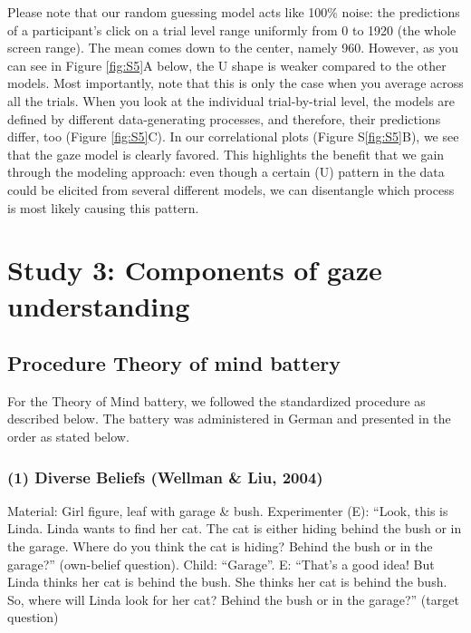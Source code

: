 \documentclass[
  man,mask,floatsintext]{apa7}
\begin{document}
Please note that our random guessing model acts like 100\% noise: the predictions of a participant's click on a trial level range uniformly from 0 to 1920 (the whole screen range). The mean comes down to the center, namely 960. However, as you can see in Figure \ref{fig:S5}A below, the U shape is weaker compared to the other models. Most importantly, note that this is only the case when you average across all the trials. When you look at the individual trial-by-trial level, the models are defined by different data-generating processes, and therefore, their predictions differ, too (Figure \ref{fig:S5}C). In our correlational plots (Figure S\ref{fig:S5}B), we see that the gaze model is clearly favored. This highlights the benefit that we gain through the modeling approach: even though a certain (U) pattern in the data could be elicited from several different models, we can disentangle which process is most likely causing this pattern.

\hypertarget{study-3-components-of-gaze-understanding}{%
\section{Study 3: Components of gaze understanding}\label{study-3-components-of-gaze-understanding}}

\hypertarget{procedure-theory-of-mind-battery}{%
\subsection{Procedure Theory of mind battery}\label{procedure-theory-of-mind-battery}}

For the Theory of Mind battery, we followed the standardized procedure as described below. The battery was administered in German and presented in the order as stated below.

\hypertarget{diverse-beliefs-wellman2004scaling}{%
\subsubsection{(1) Diverse Beliefs (Wellman \& Liu, 2004)}\label{diverse-beliefs-wellman2004scaling}}

Material: Girl figure, leaf with garage \& bush.
Experimenter (E): ``Look, this is Linda. Linda wants to find her cat. The cat is either hiding behind the bush or in the garage. Where do you think the cat is hiding? Behind the bush or in the garage?'' (own-belief question). Child: ``Garage''. E: ``That's a good idea! But Linda thinks her cat is behind the bush. She thinks her cat is behind the bush. So, where will Linda look for her cat? Behind the bush or in the garage?'' (target question)
\end{document}
